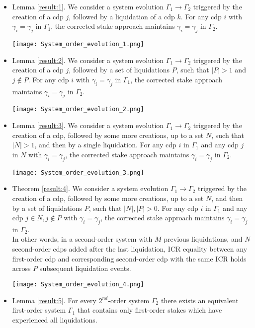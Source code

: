 \documentclass[reqno]{article}
\begin{document}
\begin{itemize}
  \item Lemma \ref{result:1}. We consider a system evolution $\Gamma_1 \rightarrow \Gamma_2$ triggered by the creation of a cdp $j$, followed by a liquidation of a cdp $k$. For any cdp $i$ with $\gamma_i = \gamma_j$ in $\Gamma_1$, the corrected stake approach maintains $\gamma_i = \gamma_j$ in $\Gamma_2$.

    \texttt{[image: System\_order\_evolution\_1.png]}

  \item Lemma \ref{result:2}. We consider a system evolution $\Gamma_1 \rightarrow \Gamma_2$ triggered by the creation of a cdp $j$, followed by a set of liquidations $P$, such that $|P| > 1$ and $j \notin P$. For any cdp $i$ with $\gamma_i = \gamma_j$ in $\Gamma_1$, the corrected stake approach maintains $\gamma_i = \gamma_j$ in $\Gamma_2$.

    \texttt{[image: System\_order\_evolution\_2.png]}

  \item Lemma \ref{result:3}. We consider a system evolution $\Gamma_1 \rightarrow \Gamma_2$ triggered by the creation of a cdp, followed by some more creations, up to a set $N$, such that $|N| > 1$, and then by a single liquidation. For any cdp $i$ in $\Gamma_1$ and any cdp $j$ in $N$ with $\gamma_i = \gamma_j$, the corrected stake approach maintains $\gamma_i = \gamma_j$ in $\Gamma_2$.

    \texttt{[image: System\_order\_evolution\_3.png]}

  \item Theorem \ref{result:4}. We consider a system evolution $\Gamma_1 \rightarrow \Gamma_2$ triggered by the creation of a cdp, followed by some more creations, up to a set $N$, and then by a set of liquidations $P$, such that $|N|, |P| > 0$. For any cdp $i$ in $\Gamma_1$ and any cdp $j \in N, j\notin P$ with $\gamma_i = \gamma_j$, the corrected stake approach maintains $\gamma_i = \gamma_j$ in $\Gamma_2$. \\
    In other words, in a second-order system with $M$ previous liquidations, and $N$ second-order cdps added after the last liquidation, ICR equality between any first-order cdp and corresponding second-order cdp with the same ICR holds across $P$ subsequent liquidation events.

    \texttt{[image: System\_order\_evolution\_4.png]}

  \item Lemma \ref{result:5}. For every $2^{nd}$-order system $\Gamma_2$ there exists an equivalent first-order system $\Gamma_1$ that contains only first-order stakes which have experienced all liquidations.


\end{itemize}
\end{document}
